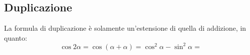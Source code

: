 \documentclass[12pt]{article}
\begin{document}
\subsection{Duplicazione}
La formula di duplicazione è solamente un'estensione di quella di addizione, in quanto:
\begin{equation}
    \cos{2\alpha} = \cos({\alpha + \alpha}) = \cos^2{\alpha} - \sin^2{\alpha} = 
\end{equation}
\end{document}
